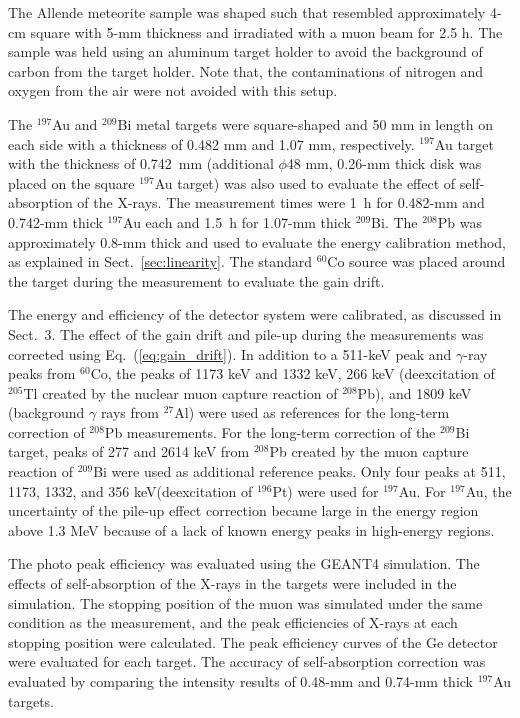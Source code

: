 The Allende meteorite sample was shaped such that resembled approximately 4-cm square with 5-mm thickness and irradiated with a muon beam for 2.5 h. The sample was held using an aluminum target holder to avoid the background of carbon from the target holder. Note that, the contaminations of nitrogen and oxygen from the air were not avoided with this setup.

The $^{197}$Au and $^{209}$Bi metal targets were square-shaped and 50 mm in length on each side with a thickness of 0.482 mm and 1.07 mm, respectively.
$^{197}$Au target with the thickness of 0.742~mm 
(additional $\phi$48 mm, 0.26-mm thick disk was placed on the square $^{197}$Au target) was also used to evaluate the effect of self-absorption of the X-rays.
The measurement times were 1~h for 0.482-mm and 0.742-mm thick $^{197}$Au each and 1.5~h for 1.07-mm thick $^{209}$Bi.
The $^{208}$Pb was approximately 0.8-mm thick and used to evaluate the energy calibration method, as explained in Sect.~\ref{sec:linearity}.
The standard $^{60}$Co source was placed around the target during the measurement to evaluate the gain drift.

The energy and efficiency of the detector system were calibrated, as discussed in Sect.~3.
The effect of the gain drift and pile-up during the measurements was corrected using Eq.~(\ref{eq:gain_drift}). 
In addition to a 511-keV peak and $\gamma$-ray peaks from $^{60}$Co, the peaks of 1173 keV and 1332 keV, 266 keV (deexcitation of $^{205}$Tl created by the nuclear muon capture reaction of $^{208}$Pb), and 1809 keV (background $\gamma$ rays from $^{27}$Al) were used as references for the long-term correction of $^{208}$Pb measurements. 
For the long-term correction of the $^{209}$Bi target, peaks of 277 and 2614 keV from $^{208}$Pb created by the muon capture reaction of $^{209}$Bi were used as additional reference peaks. 
Only four peaks at 511, 1173, 1332, and 356 keV(deexcitation of $^{196}$Pt) were used for $^{197}$Au.
For $^{197}$Au, the uncertainty of the pile-up effect correction became large in the energy region above 1.3 MeV because of a lack of known energy peaks in high-energy regions. 

The photo peak efficiency was evaluated using the GEANT4 simulation.  
The effects of self-absorption of the X-rays in the targets were included in the simulation.
The stopping position of the muon was simulated under the same condition as the measurement, and the peak efficiencies of X-rays at each stopping position were calculated.
The peak efficiency curves of the Ge detector were evaluated for each target. 
The accuracy of self-absorption correction was evaluated by comparing the intensity results of 0.48-mm and 0.74-mm thick $^{197}$Au targets. 